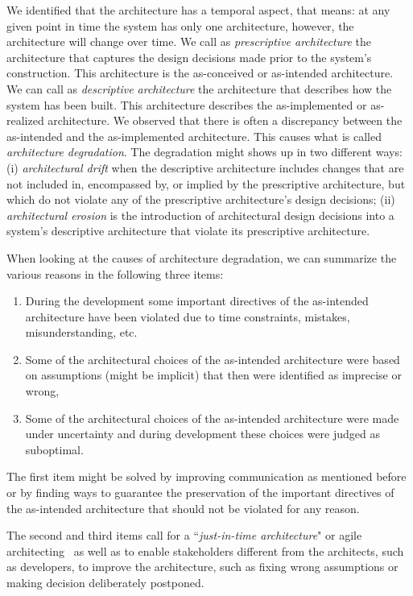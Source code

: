 We identified that the architecture has a temporal aspect, that means: at any given point in time the system
has only one architecture, however, the architecture will change over time.
We call as {\em prescriptive architecture} the architecture that captures
the design decisions made prior to the system's construction. This architecture is the as-conceived or as-intended architecture.
We can call as {\em descriptive architecture} the architecture that describes how the system has been built. This architecture describes the as-implemented or as-realized architecture. We observed that there is often a discrepancy between the as-intended and the as-implemented architecture. This causes what is called {\em architecture degradation}. The degradation might shows up in two different ways: (i) {\em architectural drift} when the descriptive architecture includes changes that are not included in, encompassed by, or implied by the
prescriptive architecture, but which do not violate any of the prescriptive architecture's
design decisions; (ii) {\em architectural erosion} is the introduction of
architectural design decisions into a system's descriptive architecture that violate its prescriptive
architecture.
 
When looking at the causes of architecture degradation, we can summarize the various reasons in the following three items: 

\begin{enumerate} 
\item During the development some important directives of the as-intended architecture have been violated due to time constraints, mistakes, misunderstanding, etc. 
\item Some of the architectural choices of the as-intended architecture were based on assumptions (might be implicit) that then were identified as imprecise or wrong, 
\item Some of the architectural choices of the as-intended architecture were made under uncertainty and during development these choices were judged as suboptimal.
\end{enumerate}

The first item might be solved by improving communication as mentioned before or by finding ways to guarantee the preservation of the  important directives of the as-intended architecture that should not be violated for any reason.

The second and third items call for a ``{\em just-in-time architecture}" or agile architecting~\cite{shahrokni2016organic}  as well as to enable stakeholders different from the architects, such as developers, to improve the architecture, such as fixing wrong assumptions or making decision deliberately postponed.




